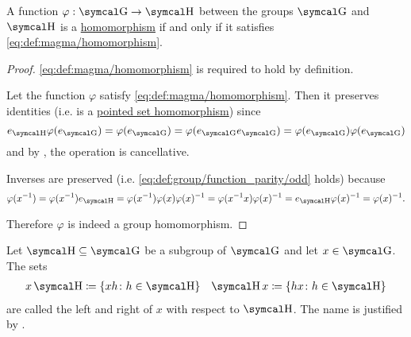 \begin{proposition}\label{thm:group_homomorphism_single_condition}
  A function \( \varphi: \CG \to \CH \) between the groups \( \CG \) and \( \CH \) is a \hyperref[def:group/homomorphism]{homomorphism} if and only if it satisfies \eqref{eq:def:magma/homomorphism}.
\end{proposition}
\begin{proof}
  \Sufficiency \eqref{eq:def:magma/homomorphism} is required to hold by definition.

  \Necessity Let the function \( \varphi \) satisfy \eqref{eq:def:magma/homomorphism}. Then it preserves identities (i.e. is a \hyperref[def:pointed_set/homomorphism]{pointed set homomorphism}) since
  \begin{equation*}
    e_{\CH} \varphi(e_{\CG}) = \varphi(e_{\CG}) = \varphi(e_{\CG} e_{\CG}) = \varphi(e_{\CG}) \varphi(e_{\CG})
  \end{equation*}
  and by , the operation is cancellative.

  Inverses are preserved (i.e. \eqref{eq:def:group/function_parity/odd} holds) because
  \begin{equation*}
    \varphi(x^{-1})
    =
    \varphi(x^{-1}) e_{\CH}
    =
    \varphi(x^{-1}) \varphi(x) \varphi(x)^{-1}
    =
    \varphi(x^{-1} x) \varphi(x)^{-1}
    =
    e_{\CH} \varphi(x)^{-1}
    =
    \varphi(x)^{-1}.
  \end{equation*}

  Therefore \( \varphi \) is indeed a group homomorphism.
\end{proof}

\begin{definition}\label{def:group_cosets}
  Let \( \CH \subseteq \CG \) be a subgroup of \( \CG \) and let \( x \in \CG \). The sets
  \begin{align*}
    x \CH \coloneqq \{ xh \colon h \in \CH \}
    &&
    \CH x \coloneqq \{ hx \colon h \in \CH \}
  \end{align*}
  are called the left and right  of \( x \) with respect to \( \CH \). The name is justified by .
\end{definition}

